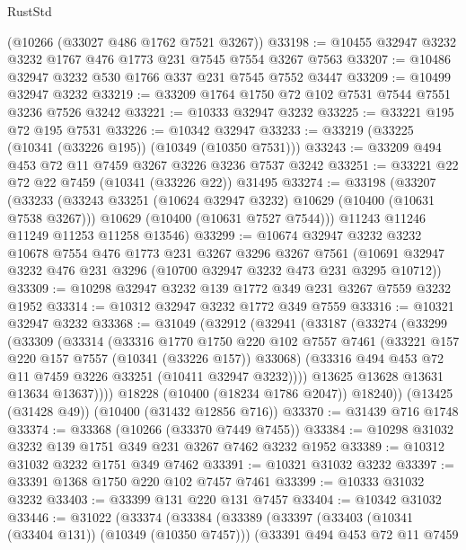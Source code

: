 \begin{lexlean}{RustStd}
\begin{coremodule}
{\begin{coremodule}
{{{{{{{{{{{{{{{{{{{{{{{{{    (@10266 (@33027 @486 @1762 @7521 @3267))
@33198 := @10455 @32947 @3232 @3232 @1767 @476 @1773 @231 @7545 @7554 @3267 @7563
@33207 := @10486 @32947 @3232 @530 @1766 @337 @231 @7545 @7552 @3447
@33209 := @10499 @32947 @3232
@33219 := @33209 @1764 @1750 @72 @102 @7531 @7544 @7551 @3236 @7526 @3242
@33221 := @10333 @32947 @3232
@33225 := @33221 @195 @72 @195 @7531
@33226 := @10342 @32947
@33233 := @33219 (@33225 (@10341 (@33226 @195)) (@10349 (@10350 @7531)))
@33243 := @33209 @494 @453 @72 @11 @7459 @3267 @3226 @3236 @7537 @3242
@33251 := @33221 @22 @72 @22 @7459 (@10341 (@33226 @22)) @31495
@33274 := @33198
    (@33207
      (@33233
        (@33243 @33251 (@10624 @32947 @3232) @10629 (@10400 (@10631 @7538 @3267)))
        @10629
        (@10400 (@10631 @7527 @7544)))
      @11243
      @11246
      @11249
      @11253
      @11258
      @13546)
@33299 := @10674
    @32947
    @3232
    @3232
    @10678
    @7554
    @476
    @1773
    @231
    @3267
    @3296
    @3267
    @7561
    (@10691 @32947 @3232 @476 @231 @3296 (@10700 @32947 @3232 @473 @231 @3295 @10712))
@33309 := @10298 @32947 @3232 @139 @1772 @349 @231 @3267 @7559 @3232 @1952
@33314 := @10312 @32947 @3232 @1772 @349 @7559
@33316 := @10321 @32947 @3232
@33368 := @31049
    (@32912
      (@32941
        (@33187
          (@33274
            (@33299
              (@33309
                (@33314
                  (@33316
                    @1770
                    @1750
                    @220
                    @102
                    @7557
                    @7461
                    (@33221 @157 @220 @157 @7557 (@10341 (@33226 @157)) @33068)
                    (@33316 @494 @453 @72 @11 @7459 @3226 @33251 (@10411 @32947 @3232))))
                @13625
                @13628
                @13631
                @13634
                @13637))))
        @18228
        (@10400 (@18234 @1786 @2047))
        @18240))
    (@13425 (@31428 @49))
    (@10400 (@31432 @12856 @716))
@33370 := @31439 @716 @1748
@33374 := @33368 (@10266 (@33370 @7449 @7455))
@33384 := @10298 @31032 @3232 @139 @1751 @349 @231 @3267 @7462 @3232 @1952
@33389 := @10312 @31032 @3232 @1751 @349 @7462
@33391 := @10321 @31032 @3232
@33397 := @33391 @1368 @1750 @220 @102 @7457 @7461
@33399 := @10333 @31032 @3232
@33403 := @33399 @131 @220 @131 @7457
@33404 := @10342 @31032
@33446 := @31022
    (@33374
      (@33384
        (@33389
          (@33397
            (@33403 (@10341 (@33404 @131)) (@10349 (@10350 @7457)))
            (@33391
              @494
              @453
              @72
              @11
              @7459
}}}}}}}}}}}}}}}}}}}}}}}}}
\end{coremodule}}
\end{coremodule}
\end{lexlean}
